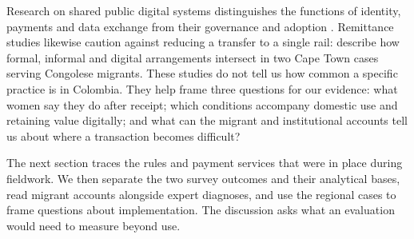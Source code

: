 Research on shared public digital systems distinguishes the functions of identity, payments and data exchange from their governance and adoption \citep{eaves_rao_verified_2025}. Remittance studies likewise caution against reducing a transfer to a single rail: \citet{cirolia_remittance_2022} describe how formal, informal and digital arrangements intersect in two Cape Town cases serving Congolese migrants. These studies do not tell us how common a specific practice is in Colombia. They help frame three questions for our evidence: what women say they do after receipt; which conditions accompany domestic use and retaining value digitally; and what can the migrant and institutional accounts tell us about where a transaction becomes difficult?



The next section traces the rules and payment services that were in place during fieldwork. We then separate the two survey outcomes and their analytical bases, read migrant accounts alongside expert diagnoses, and use the regional cases to frame questions about implementation. The discussion asks what an evaluation would need to measure beyond use.
